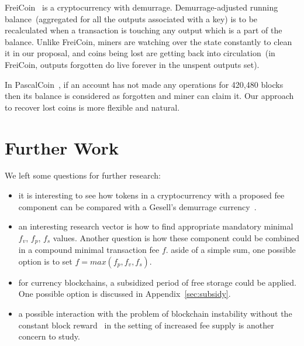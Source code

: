 \documentclass[]{llncs}   %
\begin{document}
FreiCoin~\cite{freicoin} is a cryptocurrency with demurrage. Demurrage-adjusted running balance~(aggregated for all the outputs associated with a key) is to be recalculated when a transaction is touching any output which is a part of the balance. Unlike FreiCoin, miners are watching over the state constantly to clean it in our proposal, and coins being lost are getting back into circulation~(in FreiCoin, outputs forgotten do live forever in the unspent outputs set).

In PascalCoin~\cite{pascalCoin}, if an account has not made any operations for 420,480 blocks then its balance is considered as forgotten and miner can claim it. Our approach to recover lost coins is more flexible and natural. %

\section{Further Work}

We left some questions for further research:

\begin{itemize}
  \item{}it is interesting to see how tokens in a cryptocurrency with a proposed fee component can be compared with a Gesell's demurrage currency~\cite{gesell1958natural}.
  \item{}an interesting research vector is how to find appropriate mandatory minimal $f_v$, $f_p$, $f_s$ values. Another question is how these component could be combined in a compound minimal transaction fee $f$. aside of a simple sum, one possible option is to set $f = max(f_p, f_v, f_s)$.
  \item{}for currency blockchains, a subsidized period of free storage could be applied. One possible option is discussed in Appendix~\ref{sec:subsidy}.
  \item{}a possible interaction with the problem of blockchain instability without the constant block reward~\cite{carlsten2016instability} in the setting of increased fee supply is another concern to study.
\end{itemize}




\appendix
\end{document}
